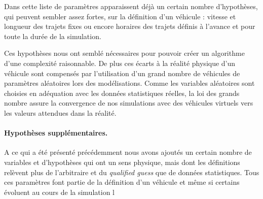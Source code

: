 		Dans cette liste de paramètres apparaissent déjà un certain nombre d'hypothèses, qui peuvent sembler assez fortes, sur la définition d'un véhicule : vitesse et longueur des trajets fixes ou encore horaires des trajets définis à l'avance et pour toute la durée de la simulation.
		
		Ces hypothèses nous ont semblé nécessaires pour pouvoir créer un algorithme d'une complexité raisonnable. De plus ces écarts à la réalité physique d'un véhicule sont compensés par l'utilisation d'un grand nombre de véhicules de paramètres aléatoires lors des modélisations. Comme les variables aléatoires sont choisies en adéquation avec les données statistiques réelles, la loi des grands nombre assure la convergence de nos simulations avec des véhicules virtuels vers les valeurs attendues dans la réalité.
		
		\paragraph{Hypothèses supplémentaires.} A ce qui a été présenté précédemment nous avons ajoutés un certain nombre de variables et d'hypothèses qui ont un sens physique, mais dont les définitions relèvent plus de l'arbitraire et du \emph{qualified guess} que de données statistiques. Tous ces paramètres font partie de la définition d'un véhicule et même si certains évoluent au cours de la simulation l
		
